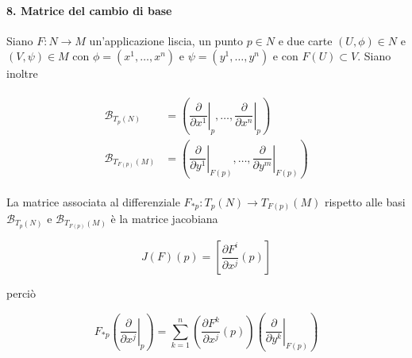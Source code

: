 \paragraph{8. Matrice del cambio di base}

Siano $ F : N \to M $ un'applicazione liscia, un punto $ p \in N $ e due carte $ (U,\phi) \in N $ e $ (V,\psi) \in M $ con $ \phi = (x^{1},\dots,x^{n}) $ e $ \psi = (y^{1},\dots,y^{n}) $ e con $ F(U) \subset V $. Siano inoltre

\begin{align}
	\begin{split}
		\mathcal{B}_{T_{p}(N)} &= \left( \left. \dfrac{\partial}{\partial x^{1}} \right|_{p} , \dots , \left. \dfrac{\partial}{\partial x^{n}} \right|_{p} \right)\\
		\mathcal{B}_{T_{F(p)}(M)} &= \left( \left. \dfrac{\partial}{\partial y^{1}} \right|_{F(p)} , \dots , \left. \dfrac{\partial}{\partial y^{m}} \right|_{F(p)} \right)
	\end{split}
\end{align}

La matrice associata al differenziale $ F_{*p} : T_{p}(N) \to T_{F(p)}(M) $ rispetto alle basi $ \mathcal{B}_{T_{p}(N)} $ e $ \mathcal{B}_{T_{F(p)}(M)} $ è la matrice jacobiana

\begin{equation}
	J(F)(p) = \left[ \dfrac{\partial F^{i}}{\partial x^{j}} (p) \right]
\end{equation}

perciò

\begin{equation}
	F_{*p} \left( \left. \dfrac{\partial}{\partial x^{j}} \right|_{p} \right) = \sum_{k=1}^{n} \left( \dfrac{\partial F^{k}}{\partial x^{j}} (p) \right) \left( \left. \dfrac{\partial}{\partial y^{k}} \right|_{F(p)} \right)
\end{equation}

